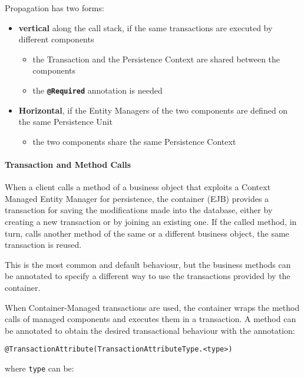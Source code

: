 \documentclass[english]{article}
\begin{document}
Propagation has two forms:

\begin{itemize}
  \item \textbf{vertical} along the call stack, if the same transactions are executed by different components
        \begin{itemize}
          \item the Transaction and the Persistence Context are shared between the components
          \item the \textbf{\texttt{@Required}} annotation is needed
        \end{itemize}
  \item \textbf{Horizontal}, if the Entity Managers of the two components are defined on the same Persistence Unit
        \begin{itemize}
          \item the two components share the same Persistence Context
        \end{itemize}
\end{itemize}

\paragraph{Transaction and Method Calls}

When a client calls a method of a business object that exploits a Context Managed Entity Manager for persistence, the container (EJB) provides a transaction for saving the modifications made into the database, either by creating a new transaction or by joining an existing one.
If the called method, in turn, calls another method of the same or a different business object, the same transaction is reused.

This is the most common and default behaviour, but the business methods can be annotated to specify a different way to use the transactions provided by the container.

\bigskip
When Container-Managed transactions are used, the container wraps the method calls of managed components and executes them in a transaction.
A method can be annotated to obtain the desired transactional behaviour with the annotation:
\begin{center}
  \texttt{@TransactionAttribute(TransactionAttributeType.<type>)}
\end{center}

where \texttt{type} can be:
\end{document}
